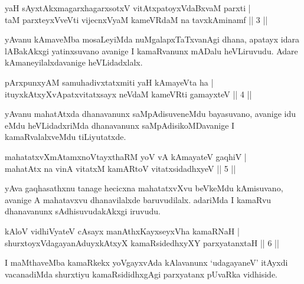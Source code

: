 \begin{shl}
yaH sAyxtAkxmagarxhagarxsotxV vitAtxpatoyxVdaBxvaM parxti | \\
taM parxteyxVveVti vijecnxVyaM kameVRdaM na tavxkAminamf \hfill|| 3 || 
\end{shl}
\newpage
\begin{artha}
yAvanu kAmaveMba mosaLeyiMda nuMgalapxTaTxvanAgi dhana, apatayx idara lABakAkxgi yatinxsuvano avanige I kamaRvanunx mADalu heVLiruvudu. Adare kAmaneyilalxdavanige heVLidadxlalx.
\end{artha}


\begin{shl}
pArxpunxyAM samuhadivxtatxmiti yaH kAmayeVta ha | \\
ituyxkAtxyX\s vApatxvitatxsayx neVdaM kameVRti gamayxteV \hfill|| 4 || 
\end{shl}

\begin{artha}
yAvanu mahatAtxda dhanavanunx saMpAdisuveneMdu bayasu\-\break vano, avanige idu eMdu heVLidadxriMda dhanavanunx saMpAdisikoMDavanige I kamaRvalalxveMdu tiLiyutatxde.
\end{artha}


\begin{shl}
mahatatxvXmAtamxnoV\s tayxthaRM yoV vA kAmayateV gaqhiV | \\
mahatAtx na vinA vitatxM kamARtoV vitatxsidadhxyeV \hfill|| 5 || 
\end{shl}

\begin{artha}
yAva gaqhasathxnu tanage hecicxna mahatatxvXvu beVkeMdu kAmisu\-\break vano, avanige A mahatavxvu dhanavilalxde baruvudilalx. adariMda I kamaRvu dhanavanunx sAdhisuvudakAkxgi iruvudu.
\end{artha}


\begin{shl}
kAloV vidhiVyateV cAsayx manAthxKayxseyxVha kamaRNaH | \\
shurxtoyxVdagayanAduyxkAtxyX kamaRsidedhxyXY parxyatanxtaH \hfill|| 6 || 
\end{shl}

\begin{artha}
I maMthaveMba kamaRkekx yoVgayxvAda kAlavanunx `udagayaneV' itAyxdi vacanadiMda shurxtiyu kamaRsididhxgAgi parxyatanx pUvaRka vidhiside.
\end{artha}

